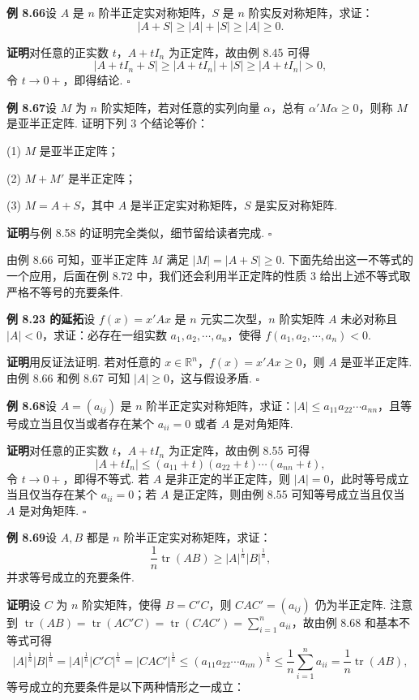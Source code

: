\documentclass[UTF8,12pt,a4paper,fontset=fandol]{ctexart}
\begin{document}
\noindent\textbf{例 8.66}\quad 设 $A$ 是 $n$ 阶半正定实对称矩阵，$S$ 是 $n$ 阶实反对称矩阵，求证：
\[
|A+S|\ge |A|+|S|\ge |A|\ge 0.
\]

\noindent\textbf{证明}\quad 对任意的正实数 $t$，$A+tI_n$ 为正定阵，故由例 8.45 可得
\[
|A+tI_n+S|\ge |A+tI_n|+|S|\ge |A+tI_n|>0,
\]
令 $t\to 0+$，即得结论. $\ensuremath{\square}$

\noindent\textbf{例 8.67}\quad 设 $M$ 为 $n$ 阶实矩阵，若对任意的实列向量 $\alpha$，总有 $\alpha'M\alpha\ge 0$，则称 $M$ 是亚半正定阵. 证明下列 3 个结论等价：

(1) $M$ 是亚半正定阵；

(2) $M+M'$ 是半正定阵；

(3) $M=A+S$，其中 $A$ 是半正定实对称矩阵，$S$ 是实反对称矩阵.

\noindent\textbf{证明}\quad 与例 8.58 的证明完全类似，细节留给读者完成. $\ensuremath{\square}$

由例 8.66 可知，亚半正定阵 $M$ 满足 $|M|=|A+S|\ge 0$. 下面先给出这一不等式的一个应用，后面在例 8.72 中，我们还会利用半正定阵的性质 3 给出上述不等式取严格不等号的充要条件.

\noindent\textbf{例 8.23 的延拓}\quad 设 $f(x)=x'Ax$ 是 $n$ 元实二次型，$n$ 阶实矩阵 $A$ 未必对称且 $|A|<0$，求证：必存在一组实数 $a_1,a_2,\cdots,a_n$，使得 $f(a_1,a_2,\cdots,a_n)<0$.

\noindent\textbf{证明}\quad 用反证法证明. 若对任意的 $x\in\mathbb{R}^n$，$f(x)=x'Ax\ge 0$，则 $A$ 是亚半正定阵. 由例 8.66 和例 8.67 可知 $|A|\ge 0$，这与假设矛盾. $\ensuremath{\square}$

\noindent\textbf{例 8.68}\quad 设 $A=(a_{ij})$ 是 $n$ 阶半正定实对称矩阵，求证：$|A|\le a_{11}a_{22}\cdots a_{nn}$，且等号成立当且仅当或者存在某个 $a_{ii}=0$ 或者 $A$ 是对角矩阵.

\noindent\textbf{证明}\quad 对任意的正实数 $t$，$A+tI_n$ 为正定阵，故由例 8.55 可得
\[
|A+tI_n|\le (a_{11}+t)(a_{22}+t)\cdots(a_{nn}+t),
\]
令 $t\to 0+$，即得不等式. 若 $A$ 是非正定的半正定阵，则 $|A|=0$，此时等号成立当且仅当存在某个 $a_{ii}=0$；若 $A$ 是正定阵，则由例 8.55 可知等号成立当且仅当 $A$ 是对角矩阵. $\ensuremath{\square}$

\noindent\textbf{例 8.69}\quad 设 $A,B$ 都是 $n$ 阶半正定实对称矩阵，求证：
\[
\frac1n\operatorname{tr}(AB)\ge |A|^{\frac1n}|B|^{\frac1n},
\]
并求等号成立的充要条件.

\noindent\textbf{证明}\quad 设 $C$ 为 $n$ 阶实矩阵，使得 $B=C'C$，则 $CAC'=(a_{ij})$ 仍为半正定阵. 注意到 $\operatorname{tr}(AB)=\operatorname{tr}(AC'C)=\operatorname{tr}(CAC')=\sum_{i=1}^n a_{ii}$，故由例 8.68 和基本不等式可得
\[
|A|^{\frac1n}|B|^{\frac1n}=|A|^{\frac1n}|C'C|^{\frac1n}
=|CAC'|^{\frac1n}\le (a_{11}a_{22}\cdots a_{nn})^{\frac1n}
\le \frac1n\sum_{i=1}^n a_{ii}=\frac1n\operatorname{tr}(AB),
\]
等号成立的充要条件是以下两种情形之一成立：
\end{document}
